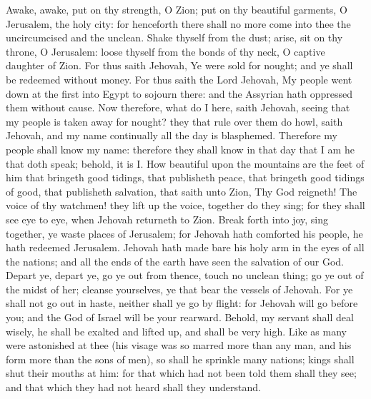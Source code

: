 Awake, awake, put on thy strength, O Zion; put on thy beautiful garments, O Jerusalem, the holy city: for henceforth there shall no more come into thee the uncircumcised and the unclean. Shake thyself from the dust; arise, sit on thy throne, O Jerusalem: loose thyself from the bonds of thy neck, O captive daughter of Zion.  For thus saith Jehovah, Ye were sold for nought; and ye shall be redeemed without money. For thus saith the Lord Jehovah, My people went down at the first into Egypt to sojourn there: and the Assyrian hath oppressed them without cause. Now therefore, what do I here, saith Jehovah, seeing that my people is taken away for nought? they that rule over them do howl, saith Jehovah, and my name continually all the day is blasphemed. Therefore my people shall know my name: therefore they shall know in that day that I am he that doth speak; behold, it is I.  How beautiful upon the mountains are the feet of him that bringeth good tidings, that publisheth peace, that bringeth good tidings of good, that publisheth salvation, that saith unto Zion, Thy God reigneth! The voice of thy watchmen! they lift up the voice, together do they sing; for they shall see eye to eye, when Jehovah returneth to Zion. Break forth into joy, sing together, ye waste places of Jerusalem; for Jehovah hath comforted his people, he hath redeemed Jerusalem. Jehovah hath made bare his holy arm in the eyes of all the nations; and all the ends of the earth have seen the salvation of our God.  Depart ye, depart ye, go ye out from thence, touch no unclean thing; go ye out of the midst of her; cleanse yourselves, ye that bear the vessels of Jehovah. For ye shall not go out in haste, neither shall ye go by flight: for Jehovah will go before you; and the God of Israel will be your rearward.  Behold, my servant shall deal wisely, he shall be exalted and lifted up, and shall be very high. Like as many were astonished at thee (his visage was so marred more than any man, and his form more than the sons of men), so shall he sprinkle many nations; kings shall shut their mouths at him: for that which had not been told them shall they see; and that which they had not heard shall they understand. 

